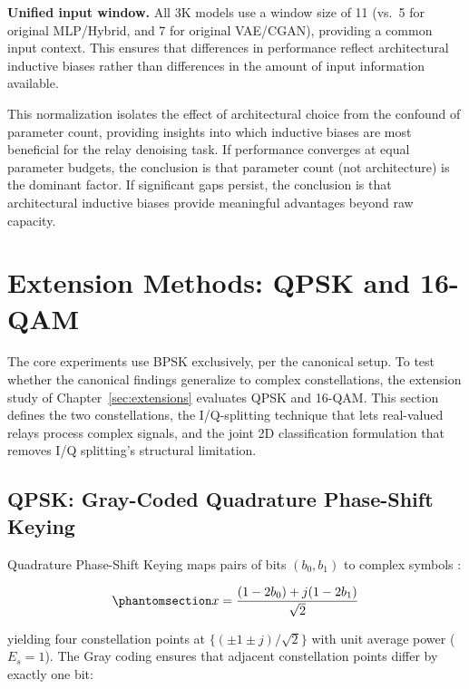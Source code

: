 \textbf{Unified input window.} All 3K models use a window size of 11 (vs.~5 for original MLP/Hybrid, and 7 for original VAE/CGAN), providing a common input context. This ensures that differences in performance reflect architectural inductive biases rather than differences in the amount of input information available.

This normalization isolates the effect of architectural choice from the confound of parameter count, providing insights into which inductive biases are most beneficial for the relay denoising task. If performance converges at equal parameter budgets, the conclusion is that parameter count (not architecture) is the dominant factor. If significant gaps persist, the conclusion is that architectural inductive biases provide meaningful advantages beyond raw capacity.

\section{Extension Methods: QPSK and 16-QAM}\label{sec:modulation-schemes}

The core experiments use BPSK exclusively, per the canonical setup. To test whether the canonical findings generalize to complex constellations, the extension study of Chapter~\ref{sec:extensions} evaluates QPSK and 16-QAM. This section defines the two constellations, the I/Q-splitting technique that lets real-valued relays process complex signals, and the joint 2D classification formulation that removes I/Q splitting's structural limitation.

\subsection{QPSK: Gray-Coded Quadrature Phase-Shift Keying}\label{sec:qpsk-gray-coded-quadrature-phase-shift-keying}

Quadrature Phase-Shift Keying maps pairs of bits \((b_0, b_1)\) to complex symbols \cite{ProakisSalehi2008DigitalComm}:

\begin{equation}\protect\phantomsection\label{eq:qpsk-mapping}{x = \frac{(1 - 2b_0) + j(1 - 2b_1)}{\sqrt{2}}
}\end{equation}

yielding four constellation points at \(\{(\pm 1 \pm j)/\sqrt{2}\}\) with unit average power (\(E_s = 1\)). The Gray coding ensures that adjacent constellation points differ by exactly one bit:

